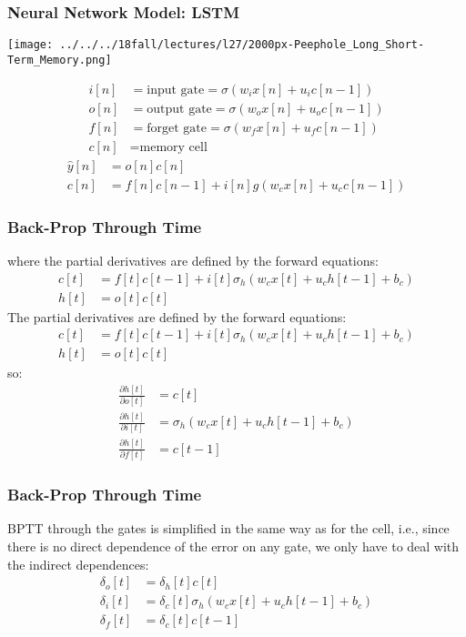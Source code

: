 \begin{frame}
  \frametitle{Neural Network Model: LSTM}
  \centerline{\texttt{[image: ../../../18fall/lectures/l27/2000px-Peephole\_Long\_Short-Term\_Memory.png]}}
  \begin{align*}
    i[n] &=\mbox{input gate}=\sigma(w_i x[n]+u_i c[n-1])\\
    o[n] &=\mbox{output gate}=\sigma(w_o x[n]+u_o c[n-1])\\
    f[n] &=\mbox{forget gate}=\sigma(w_f x[n]+u_f c[n-1])\\
    c[n] &=\mbox{memory cell}
  \end{align*}
  \begin{align*}
    \hat{y}[n] &= o[n]c[n]\\
    c[n] &= f[n]c[n-1] + i[n]g\left(w_c x[n]+u_c c[n-1]\right)
  \end{align*}
\end{frame}
    
\begin{frame}
  \frametitle{Back-Prop Through Time}
  where the partial derivatives are defined by the forward equations:
  \begin{align*}
    c[t] &=f[t]c[t-1]+i[t]\sigma_h\left(w_cx[t]+u_ch[t-1]+b_c\right)\\
    h[t] &=o[t]c[t]
  \end{align*}
  The partial derivatives are defined by the forward equations:
  \begin{align*}
    c[t] &=f[t]c[t-1]+i[t]\sigma_h\left(w_cx[t]+u_ch[t-1]+b_c\right)\\
    h[t] &=o[t]c[t]
  \end{align*}
  so:
  \begin{align*}
    \frac{\partial h[t]}{\partial o[t]} &= c[t]\\
    \frac{\partial h[t]}{\partial i[t]} &= \sigma_h\left(w_cx[t]+u_ch[t-1]+b_c\right)\\
    \frac{\partial h[t]}{\partial f[t]} &= c[t-1]
  \end{align*}
\end{frame}

\begin{frame}
  \frametitle{Back-Prop Through Time}
  
  BPTT through the gates is simplified in the same way as for the
  cell, i.e., since there is no direct dependence of the error on any
  gate, we only have to deal with the indirect dependences:
  \begin{align*}
    \delta_o[t] &= \delta_h[t]c[t]\\
    \delta_i[t] &= \delta_c[t]\sigma_h\left(w_cx[t]+u_ch[t-1]+b_c\right)\\
    \delta_f[t] &= \delta_c[t]c[t-1]
  \end{align*}
\end{frame}

